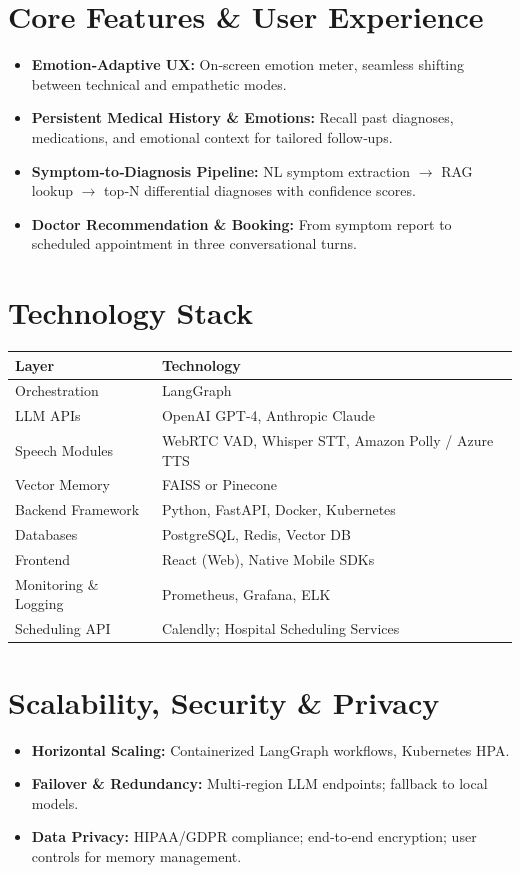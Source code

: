 \documentclass[11pt,a4paper]{article}
\begin{document}
\section{Core Features \& User Experience}
\begin{itemize}[left=0pt]
  \item \textbf{Emotion‐Adaptive UX:} On‐screen emotion meter, seamless shifting between technical and empathetic modes.
  \item \textbf{Persistent Medical History \& Emotions:} Recall past diagnoses, medications, and emotional context for tailored follow‐ups.
  \item \textbf{Symptom‐to‐Diagnosis Pipeline:} NL symptom extraction $\to$ RAG lookup $\to$ top‐N differential diagnoses with confidence scores.
  \item \textbf{Doctor Recommendation \& Booking:} From symptom report to scheduled appointment in three conversational turns.
\end{itemize}

\section{Technology Stack}
\begin{tabular}{@{}ll@{}}
\toprule
\textbf{Layer}              & \textbf{Technology} \\
\midrule
Orchestration              & LangGraph \\
LLM APIs                   & OpenAI GPT‐4, Anthropic Claude \\
Speech Modules             & WebRTC VAD, Whisper STT, Amazon Polly / Azure TTS \\
Vector Memory              & FAISS or Pinecone \\
Backend Framework          & Python, FastAPI, Docker, Kubernetes \\
Databases                  & PostgreSQL, Redis, Vector DB \\
Frontend                   & React (Web), Native Mobile SDKs \\
Monitoring \& Logging       & Prometheus, Grafana, ELK \\
Scheduling API             & Calendly; Hospital Scheduling Services \\
\bottomrule
\end{tabular}

\section{Scalability, Security \& Privacy}
\begin{itemize}[left=0pt]
  \item \textbf{Horizontal Scaling:} Containerized LangGraph workflows, Kubernetes HPA.
  \item \textbf{Failover \& Redundancy:} Multi‐region LLM endpoints; fallback to local models.
  \item \textbf{Data Privacy:} HIPAA/GDPR compliance; end‐to‐end encryption; user controls for memory management.
\end{itemize}
\end{document}
